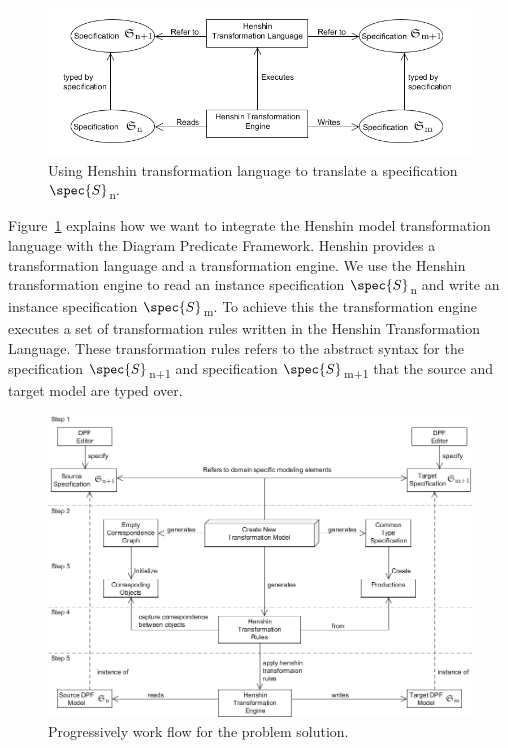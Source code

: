 \begin{figure}[H]
	\centering
	\includegraphics[scale=0.7]{./Figures/TransformationSolutionBasic.png}
	\caption[Integrating Henshin with DPF]
	{Using Henshin transformation language to translate a specification
	$\spec{S}$\textsubscript{n}.}
	\label{fig:Simple_Solution}
\end{figure}


Figure~\ref{fig:Simple_Solution} explains how we want to integrate the Henshin
model transformation language with the Diagram Predicate Framework. Henshin
provides a transformation language and a transformation engine. We
use the Henshin transformation engine to read an instance specification
$\spec{S}$\textsubscript{n} and write an instance specification
$\spec{S}$\textsubscript{m}. To achieve this the transformation engine executes
a set of transformation rules written in the Henshin Transformation Language.
These transformation rules refers to the abstract syntax for the
specification $\spec{S}$\textsubscript{n+1} and specification
$\spec{S}$\textsubscript{m+1} that the source and target model are typed over.

\begin{figure}[H]
	\centering
	\includegraphics[scale=0.65]{./Figures/flowchart_v2.png}
	\caption[Work flow for the solution]
	{Progressively work flow for the problem solution.}
	\label{fig:work_flow_solution}
\end{figure}

